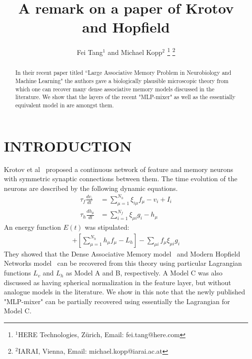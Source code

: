 \documentclass[letterpaper, 10 pt, conference]{ieeeconf}  %
\title{\LARGE \bf
A remark on a paper of Krotov and Hopfield
}
\author{Fei Tang$^{1}$ and Michael Kopp$^{2}$%
\thanks{$^{1}$HERE Technologies, Z\"urich,
Email: fei.tang@here.com}%
\thanks{$^{2}$IARAI, Vienna,
Email: michael.kopp@iarai.ac.at}%
}
\begin{document}
\maketitle
\thispagestyle{empty}
\pagestyle{empty}


\noindent
\begin{abstract}
\noindent
In their recent paper titled ``Large Associative Memory Problem in Neurobiology and Machine Learning" \cite{krotov2021large} the authors gave a biologically plausible microscopic theory from which one can recover many dense associative memory models discussed in the literature. We show that the layers of the recent "MLP-mixer" \cite{tolstikhin2021mlpmixer} as well as the essentially equivalent model in \cite{melaskyriazi2021need} are amongst them.
\end{abstract}

\section{INTRODUCTION}
\noindent
Krotov et al~\cite{krotov2021large} proposed a continuous network of feature and memory neurons with symmetric synaptic connections between them. The time evolution of the neurons are described by the following dynamic equations.
\begin{align}
    \tau_f \frac{dv_i}{dt} &= \sum_{\mu = 1}^{N_h}\xi_{i\mu}f_{\mu} - v_i + I_i  \nonumber\\
\tau_h \frac{dh_{\mu}}{dt} &= \sum_{i=1}^{N_f}\xi_{\mu i}g_i - h_{\mu}
\end{align}
An energy function $E(t)$ was stipulated:
\begin{align}
[\sum_{i = 1}^{N_f}(v_i - I_i)g_i - L_v] + [\sum_{\mu=1}^{N_h}h_{\mu}f_{\mu} - L_h] - \sum_{\mu i} f_{\mu}\xi_{\mu i}g_i
\end{align}
They showed that the Dense Associative Memory model~\cite{krotov2016dense} and Modern Hopfield Networks model~\cite{ramsauer2021hopfield} can be recovered from this theory using particular Lagrangian functions $L_v$ and $L_h$ as Model A and B, respectively. A Model C was also discussed as having spherical normalization in the feature layer, but without analogue models in the literature. We show in this note that the newly published "MLP-mixer" \cite{tolstikhin2021mlpmixer} can be partially recovered using essentially the Lagrangian for Model C.
\end{document}
